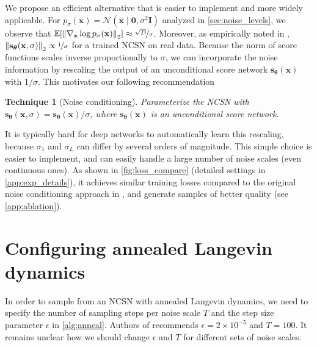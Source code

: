\documentclass{article}
\newcommand{\mbb}[1]{\mathbb{#1}}
\newcommand{\mcal}{\mathcal}
\newcommand{\norm}[1]{\left\lVert#1\right\rVert}
\newtheorem{recipe}{Technique}
\newcommand{\bfx}{\mathbf{x}}
\newcommand{\bfI}{\mathbf{I}}
\newcommand{\bfzero}{\mathbf{0}}
\newcommand{\bftheta}{{\boldsymbol{\theta}}}
\newcommand{\bfs}{\mathbf{s}}
\begin{document}
We propose an efficient alternative that is easier to implement and more widely applicable. For $p_\sigma(\bfx) = \mcal{N}(\bfx\mid \bfzero, \sigma^2 \bfI)$ analyzed in \cref{sec:noise_levels}, we observe that $\mbb{E}[\norm{\nabla_\bfx \log p_\sigma(\bfx)}_2] \approx \nicefrac{\sqrt{D}}{\sigma}$. Moreover, as empirically noted in \cite{song2019generative}, $\norm{\bfs_\bftheta(\bfx, \sigma)}_2 \propto \nicefrac{1}{\sigma}$ for a trained NCSN on real data. Because the norm of score functions scales inverse proportionally to $\sigma$, we can incorporate the noise information by rescaling the output of an unconditional score network $\bfs_\bftheta(\bfx)$ with $1/\sigma$. This motivates our following recommendation 
\begin{recipe}[Noise conditioning]\label{rec:cond}
Parameterize the NCSN with $\bfs_\bftheta(\bfx, \sigma) = \bfs_\bftheta(\bfx) / \sigma$, where $\bfs_\bftheta(\bfx)$ is an unconditional score network.
\end{recipe}It is typically hard for deep networks to automatically learn this rescaling, because $\sigma_1$ and $\sigma_L$ can differ by several orders of magnitude. This simple choice is easier to implement, and can easily handle a large number of noise scales (even continuous ones). As shown in \cref{fig:loss_compare} (detailed settings in \cref{app:exp_details}), it achieves similar training losses compared to the original noise conditioning approach in \cite{song2019generative}, and generate samples of better quality (see \cref{app:ablation}).

\section{Configuring annealed Langevin dynamics}

In order to sample from an NCSN with annealed Langevin dynamics, we need to specify the number of sampling steps per noise scale $T$ and the step size parameter $\epsilon$ in \cref{alg:anneal}. Authors of \cite{song2019generative} recommends $\epsilon=2 \times 10^{-5}$ and $T = 100$. It remains unclear how we should change $\epsilon$ and $T$ for different sets of noise scales. 
\end{document}
